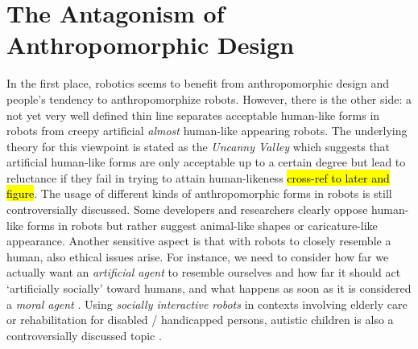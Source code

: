 \documentclass[twocolumn]{svjour3}          %
\begin{document}
\section{The Antagonism of Anthropomorphic Design}
\label{sec:2}

	
	In the first place, robotics seems to benefit from anthropomorphic design and people's tendency to anthropomorphize robots. However, there is the other side: a not yet very well defined thin line separates acceptable human-like forms in robots from creepy artificial \textit{almost} human-like appearing robots. The underlying theory for this viewpoint is stated as the \textit{Uncanny Valley} \cite{mori_uncanny_1970} which suggests that artificial human-like forms are only acceptable up to a certain degree but lead to reluctance if they fail in trying to attain human-likeness \hl{cross-ref to later and figure}. The usage of different kinds of anthropomorphic forms in robots is still controversially discussed. Some developers and researchers clearly oppose human-like forms in robots but rather suggest animal-like shapes or caricature-like appearance. Another sensitive aspect is that with robots to closely resemble a human, also ethical issues arise. For instance, we need to consider how far we actually want an \textit{artificial agent} to resemble ourselves and how far it should act `artificially socially' toward humans, and what happens as soon as it is considered a \textit{moral agent} \cite{sullins_when_2006}. Using \textit{socially interactive robots} in contexts involving elderly care or rehabilitation for disabled / handicapped persons, autistic children is also a controversially discussed topic \cite{robins_robots_2005}.
	
\end{document}

